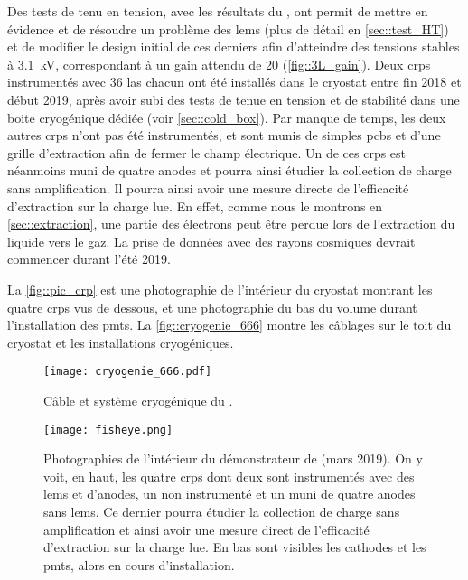       Des tests de tenu en tension, avec les résultats du \TOO{}, ont permit de mettre en évidence et de résoudre un problème des \glspl{lem} (plus de détail en \autoref{sec::test_HT}) et de modifier le design initial de ces derniers afin d'atteindre des tensions stables à \SI{3.1}{\kilo\volt}, correspondant à un gain attendu de 20 (\autoref{fig::3L_gain}). Deux \glspl{crp} instrumentés avec 36 \gls{las} chacun ont été installés dans le cryostat entre fin 2018 et début 2019, après avoir subi des tests de tenue en tension et de stabilité dans une boite cryogénique dédiée (voir \autoref{sec::cold_box}). Par manque de temps, les deux autres \glspl{crp} n'ont pas été instrumentés, et sont munis de simples \glspl{pcb} et d'une grille d'extraction afin de fermer le champ électrique. Un de ces \glspl{crp} est néanmoins muni de quatre anodes et pourra ainsi étudier la collection de charge sans amplification. Il pourra ainsi avoir une mesure directe de l'efficacité d'extraction sur la charge lue. En effet, comme nous le montrons en \autoref{sec::extraction}, une partie des électrons peut être perdue lors de l'extraction du liquide vers le gaz. La prise de données avec des rayons cosmiques devrait commencer durant l'été 2019. 

      La \autoref{fig::pic_crp} est une photographie de l'intérieur du cryostat montrant les quatre \glspl{crp} vus de dessous, et une photographie du bas du volume durant l'installation des \glspl{pmt}. La \autoref{fig::cryogenie_666} montre les câblages sur le toit du cryostat et les installations cryogéniques.

      \begin{figure}[htbp]
        \centering
        \texttt{[image: cryogenie\_666.pdf]}
        \caption[Câble et système cryogénique du \SSS{}]{\label{fig::cryogenie_666}Câble et système cryogénique du \SSS{}.}
      \end{figure}

      \begin{figure}[htbp]
        \centering
        \texttt{[image: fisheye.png]}        
        \caption[Photographie de l'intétrieur du démonstrateur de \SSS{}]{\label{fig::pic_crp}Photographies de l'intérieur du démonstrateur de \SSS{} (mars 2019). On y voit, en haut, les quatre \glspl{crp} dont deux sont instrumentés avec des \glspl{lem} et d'anodes, un non instrumenté et un muni de quatre anodes sans \glspl{lem}. Ce dernier pourra étudier la collection de charge sans amplification et ainsi avoir une mesure direct de l'efficacité d'extraction sur la charge lue. En bas sont visibles les cathodes et les \glspl{pmt}, alors en cours d'installation.}
      \end{figure}

